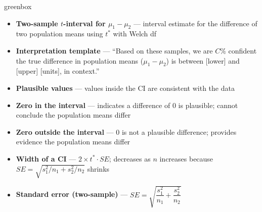 \documentclass[10pt]{article}
\begin{document}
\begin{skillbox}{greenbox}
\begin{minipage}[t]{0.48\linewidth}
    \begin{itemize}
        \item \textbf{Two-sample $t$-interval for $\mu_1 - \mu_2$} --- interval estimate
              for the difference of two population means using $t^*$ with Welch df
        \item \textbf{Interpretation template} --- ``Based on these samples, we are $C\%$
              confident the true difference in population means ($\mu_1 - \mu_2$) is
              between [lower] and [upper] [units], in context.''
        \item \textbf{Plausible values} --- values inside the CI are consistent with the data
    \end{itemize}
\end{minipage}
\hfill
\begin{minipage}[t]{0.48\linewidth}
    \begin{itemize}
        \item \textbf{Zero in the interval} --- indicates a difference of 0 is plausible;
              cannot conclude the population means differ
        \item \textbf{Zero outside the interval} --- 0 is not a plausible difference;
              provides evidence the population means differ
        \item \textbf{Width of a CI} --- $2 \times t^* \cdot SE$; decreases as $n$ increases
              because $SE = \sqrt{s_1^2/n_1 + s_2^2/n_2}$ shrinks
        \item \textbf{Standard error (two-sample)} ---
              $SE = \sqrt{\dfrac{s_1^2}{n_1} + \dfrac{s_2^2}{n_2}}$
    \end{itemize}
\end{minipage}
\end{skillbox}
\end{document}
